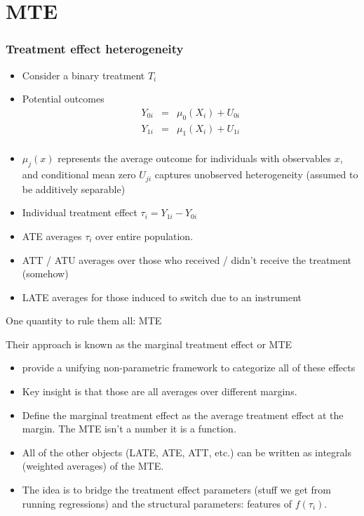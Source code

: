 \section{MTE}

\begin{frame}
  \frametitle{Treatment effect heterogeneity}
  \begin{itemize}
    \item Consider a binary treatment $T_i$
    \item Potential outcomes
      \begin{eqnarray*}
      Y_{0i} &=& \mu_{0}(X_i) + U_{0i} \\
      Y_{1i} &=& \mu_{1}(X_i) + U_{1i}\\
      \end{eqnarray*}
    \item $\mu_j(x)$ represents the average outcome for individuals with observables $x$, and conditional mean zero $U_{ji}$ captures unobserved heterogeneity (assumed to be additively separable)
    \item Individual treatment effect $\tau_i = Y_{1i} - Y_{0i}$ 
    \item ATE averages $\tau_i$ over entire population.
    \item ATT / ATU averages over those who received / didn't receive the treatment (somehow)
    \item LATE averages for those induced to switch due to an instrument 
  \end{itemize}
\end{frame}

\begin{frame}{One quantity to rule them all: MTE}

 Their approach is known as the \alert{marginal treatment effect} or MTE
\begin{itemize}
\item \citet{heckman2005structural} provide a unifying non-parametric framework to categorize all of these effects
\item Key insight is that those are all averages over different margins. 
\item Define the \alert{marginal treatment effect} as the average treatment effect at the margin. The MTE isn't a number it is a \alert{function}.
\item All of the other objects (LATE, ATE, ATT, etc.) can be written as integrals (weighted averages) of the MTE.
\item The idea is to bridge the treatment effect parameters (stuff we get from running regressions) and the structural parameters: features of $f(\tau_i)$.
\end{itemize}
\end{frame}

